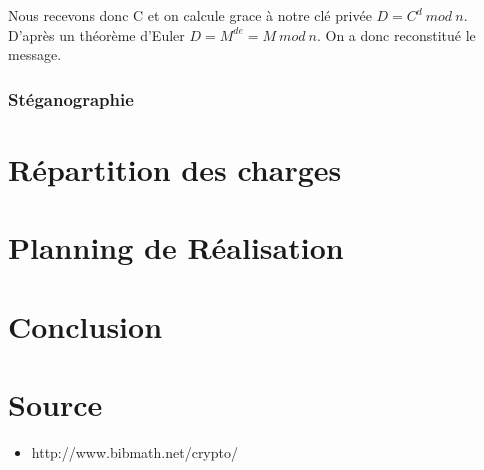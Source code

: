 \documentclass[a4paper,12pt]{article}
\begin{document}
Nous recevons donc C et on calcule grace à notre clé privée \begin{math}D = C^{d}\ mod\ n\end{math}. D'après un théorème d'Euler \begin{math}D=M^{de}=M \ mod\ n\end{math}. On a donc reconstitué le message.
		\section{Stéganographie}
	\newpage
	\part{Répartition des charges}
	\newpage
	\part{Planning de Réalisation} %
	\newpage
	\part{Conclusion}
	\newpage
	\part*{Source}
		\begin{itemize}
			\item  http://www.bibmath.net/crypto/
		\end{itemize}
\end{document}
